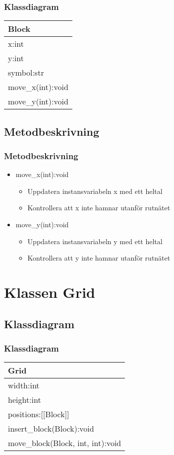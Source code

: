 \documentclass[aspectratio=169]{beamer}
\begin{document}
\begin{frame}
	\frametitle{Klassdiagram}
	\centering
	\begin{tabular}{|l|}
		\hline
		\textbf{Block}\\ \hline
		x:int\\
		y:int\\
		symbol:str\\ \hline
		move\_x(int):void\\
		move\_y(int):void\\ \hline	
	\end{tabular}
	
\end{frame}

\subsection{Metodbeskrivning}

\begin{frame}
	\frametitle{Metodbeskrivning}
	
	\begin{itemize}
		\item move\_x(int):void
		\begin{itemize}
			\item Uppdatera instansvariabeln x med ett heltal
			\item Kontrollera att x inte hamnar utanför rutnätet
		\end{itemize}
		\item move\_y(int):void
		\begin{itemize}
			\item Uppdatera instansvariabeln y med ett heltal
			\item Kontrollera att y inte hamnar utanför rutnätet
		\end{itemize}
	\end{itemize}
	
\end{frame}

\section{Klassen Grid}

\subsection{Klassdiagram}

\begin{frame}
	\frametitle{Klassdiagram}
	
	\centering
	
	\begin{tabular}{|l|}
		\hline
		Grid \\ \hline
		width:int\\
		height:int\\
		positions:[[Block]]\\ \hline
		insert\_block(Block):void\\
		move\_block(Block, int, int):void\\\hline
	\end{tabular}
	
\end{frame}
\end{document}
